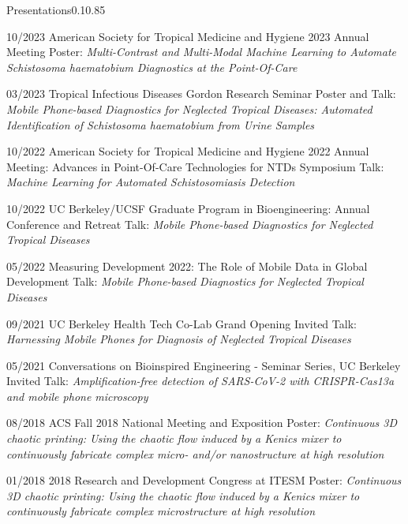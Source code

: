 \documentclass{federico_cv}
\begin{document}
\begin{tblSection}{Presentations}{0.1}{0.85}

\leftbfrightsingle
{10/2023}
{American Society for Tropical Medicine and Hygiene 2023 Annual Meeting}
{Poster: \textit{Multi-Contrast and Multi-Modal Machine Learning to Automate Schistosoma haematobium Diagnostics at the Point-Of-Care}}

\leftbfrightsingle
{03/2023}
{Tropical Infectious Diseases Gordon Research Seminar}
{Poster and Talk: \textit{Mobile Phone-based Diagnostics for Neglected Tropical Diseases: Automated Identification of Schistosoma haematobium from Urine Samples}}

\leftbfrightsingle
{10/2022}
{American Society for Tropical Medicine and Hygiene 2022 Annual Meeting: Advances in Point-Of-Care Technologies for NTDs Symposium}
{Talk: \textit{Machine Learning for Automated Schistosomiasis Detection}}

\leftbfrightsingle
{10/2022}
{UC Berkeley/UCSF Graduate Program in Bioengineering: Annual Conference and Retreat}
{Talk: \textit{Mobile Phone-based Diagnostics for Neglected Tropical Diseases}}

\leftbfrightsingle
{05/2022}
{Measuring Development 2022: The Role of Mobile Data in Global Development}
{Talk: \textit{Mobile Phone-based Diagnostics for Neglected Tropical Diseases}}

\leftbfrightsingle
{09/2021}
{UC Berkeley Health Tech Co-Lab Grand Opening}
{Invited Talk: \textit{Harnessing Mobile Phones for Diagnosis of Neglected Tropical Diseases}}

\leftbfrightsingle
{05/2021}
{Conversations on Bioinspired Engineering - Seminar Series, UC Berkeley}
{Invited Talk: \textit{Amplification-free detection of SARS-CoV-2 with CRISPR-Cas13a and mobile phone microscopy}}

\leftbfrightsinglenobreak
{08/2018}
{ACS Fall 2018 National Meeting and Exposition}
{Poster: \textit{Continuous 3D chaotic printing: Using the chaotic flow induced by a Kenics mixer to continuously fabricate complex micro- and/or nanostructure at high resolution}}

\leftbfrightsingle
{01/2018}
{2018 Research and Development Congress at ITESM}
{Poster: \textit{Continuous 3D chaotic printing: Using the chaotic flow induced by a Kenics mixer to continuously fabricate complex microstructure at high resolution}}

\end{tblSection}
\end{document}

